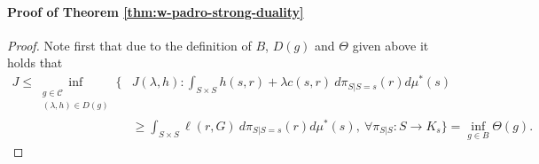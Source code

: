 \documentclass{article}
\newcommand{\R}{\mathbb{R}} %
\theoremstyle{definition}
\theoremstyle{remarksty}
\begin{document}
\paragraph{Proof of Theorem \ref{thm:w-padro-strong-duality}}
\begin{proof}

    Note first that due to the definition of $B$, $D(g)$ and $\Theta$ given above it holds that 
    \begin{align}\label{eq:initialest}
        J \leq \inf_{\substack{g \in \mathcal{C} \\ (\lambda, h) \in D(g)}} \bigg\{ & J(\lambda, h):  \int_{S\times S} h(s,r) + \lambda c(s,r)\ d\pi_{S|S=s}(r)d\mu^*(s) \nonumber \\
        &\geq \int_{S \times S} \ell(r,G)\ d\pi_{S|S=s}(r)d\mu^*(s),\ \forall \pi_{S|S}: S \rightarrow K_s \bigg\} =  \inf_{g \in  B} \Theta(g).
    \end{align}


\end{proof}
\end{document}
